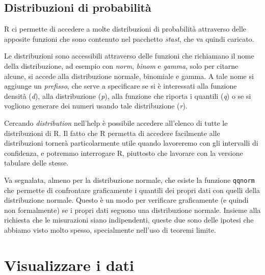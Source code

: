 \documentclass[]{book}
\begin{document}
\hypertarget{distribuzioni-di-probabilita}{%
\section{Distribuzioni di probabilità}\label{distribuzioni-di-probabilita}}

R ci permette di accedere a molte distribuzioni di probabilità attraverso delle apposite funzioni che sono contenuto nel pacchetto \emph{stast}, che va quindi caricato.

Le distribuzioni sono accessibili attraverso delle funzioni che richiamano il nome della distribuzione, ad esempio con \emph{norm}, \emph{binom} e \emph{gamma}, solo per citarne alcune, si accede alla distribuzione normale, binomiale e gamma. A tale nome si aggiunge un \emph{prefisso}, che serve a specificare se si è interessati alla funzione densità (\emph{d}), alla distribuzione (\emph{p}), alla funzione che riporta i quantili (\emph{q}) o se si vogliono generare dei numeri usando tale distribuzione (\emph{r}).

Cercando \emph{distribution} nell'help è possibile accedere all'elenco di tutte le distribuzioni di R. Il fatto che R permetta di accedere facilmente alle distribuzioni tornerà particolarmente utile quando lavoreremo con gli intervalli di confidenza, e potremmo interrogare R, piuttosto che lavorare con la versione tabulare delle stesse.

Va segnalata, almeno per la distribuzione normale, che esiste la funzione \texttt{qqnorm} che permette di confrontare graficamente i quantili dei propri dati con quelli della distribuzione normale. Questo è un modo per verificare graficamente (e quindi non formalmente) se i propri dati seguono una distribuzione normale. Insieme alla richiesta che le misurazioni siano indipendenti, queste due sono delle ipotesi che abbiamo visto molto spesso, specialmente nell'uso di teoremi limite.

\hypertarget{visualizzare-i-dati}{%
\chapter{Visualizzare i dati}\label{visualizzare-i-dati}}
\end{document}
